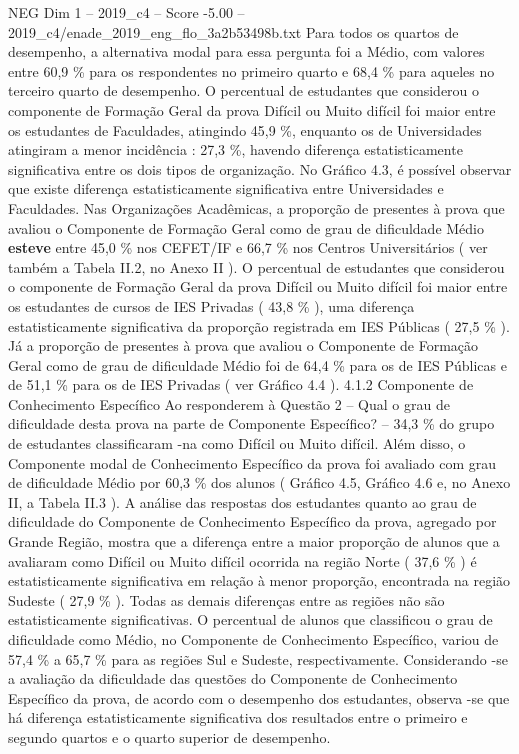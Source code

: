 \begin{textsample}{NEG Dim 1 – 2019\_c4 – Score -5.00 – 2019\_c4/enade\_2019\_eng\_flo\_3a2b53498b.txt}
Para todos os quartos de desempenho, a alternativa modal para essa pergunta foi a Médio, com valores entre 60,9 \% para os respondentes no primeiro quarto e 68,4 \% para aqueles no terceiro quarto de desempenho.
O percentual de estudantes que considerou o componente de Formação Geral da prova Difícil ou Muito difícil foi maior entre os estudantes de Faculdades, atingindo 45,9 \%, enquanto os de Universidades atingiram a menor incidência : 27,3 \%, havendo diferença estatisticamente significativa entre os dois tipos de organização.
No Gráfico 4.3, é possível observar que existe diferença estatisticamente significativa entre Universidades e Faculdades.
Nas Organizações Acadêmicas, a proporção de presentes à prova que avaliou o Componente de Formação Geral como de grau de dificuldade Médio \textbf{esteve} entre 45,0 \% nos CEFET/IF e 66,7 \% nos Centros Universitários ( ver também a Tabela II.2, no Anexo II ).
O percentual de estudantes que considerou o componente de Formação Geral da prova Difícil ou Muito difícil foi maior entre os estudantes de cursos de IES Privadas ( 43,8 \% ), uma diferença estatisticamente significativa da proporção registrada em IES Públicas ( 27,5 \% ).
Já a proporção de presentes à prova que avaliou o Componente de Formação Geral como de grau de dificuldade Médio foi de 64,4 \% para os de IES Públicas e de 51,1 \% para os de IES Privadas ( ver Gráfico 4.4 ). 4.1.2 Componente de Conhecimento Específico Ao responderem à Questão 2 – Qual o grau de dificuldade desta prova na parte de Componente Específico? – 34,3 \% do grupo de estudantes classificaram -na como Difícil ou Muito difícil.
Além disso, o Componente modal de Conhecimento Específico da prova foi avaliado com grau de dificuldade Médio por 60,3 \% dos alunos ( Gráfico 4.5, Gráfico 4.6 e, no Anexo II, a Tabela II.3 ).
A análise das respostas dos estudantes quanto ao grau de dificuldade do Componente de Conhecimento Específico da prova, agregado por Grande Região, mostra que a diferença entre a maior proporção de alunos que a avaliaram como Difícil ou Muito difícil ocorrida na região Norte ( 37,6 \% ) é estatisticamente significativa em relação à menor proporção, encontrada na região Sudeste ( 27,9 \% ).
Todas as demais diferenças entre as regiões não são estatisticamente significativas.
O percentual de alunos que classificou o grau de dificuldade como Médio, no Componente de Conhecimento Específico, variou de 57,4 \% a 65,7 \% para as regiões Sul e Sudeste, respectivamente.
Considerando -se a avaliação da dificuldade das questões do Componente de Conhecimento Específico da prova, de acordo com o desempenho dos estudantes, observa -se que há diferença estatisticamente significativa dos resultados entre o primeiro e segundo quartos e o quarto superior de desempenho.

\end{textsample}
